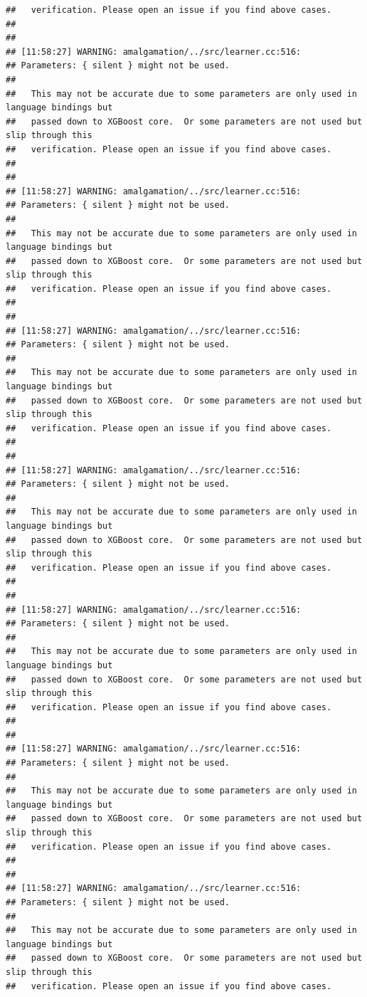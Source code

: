 \documentclass[AMS,STIX2COL]{WileyNJD-v2}\usepackage[]{graphicx}\usepackage[]{color}
\makeatletter
\newenvironment{kframe}{%
 \def\at@end@of@kframe{}%
 \ifinner\ifhmode%
  \def\at@end@of@kframe{\end{minipage}}%
  \begin{minipage}{\columnwidth}%
 \fi\fi%
 \def\FrameCommand##1{\hskip\@totalleftmargin \hskip-\fboxsep
 \colorbox{shadecolor}{##1}\hskip-\fboxsep
     \hskip-\linewidth \hskip-\@totalleftmargin \hskip\columnwidth}%
 \MakeFramed {\advance\hsize-\width
   \@totalleftmargin\z@ \linewidth\hsize
   \@setminipage}}%
 {\par\unskip\endMakeFramed%
 \at@end@of@kframe}
\newenvironment{knitrout}{}{} %
\makeatother
\begin{document}
\begin{knitrout}
\begin{kframe}
\begin{verbatim}
##   verification. Please open an issue if you find above cases.
## 
## 
## [11:58:27] WARNING: amalgamation/../src/learner.cc:516: 
## Parameters: { silent } might not be used.
## 
##   This may not be accurate due to some parameters are only used in language bindings but
##   passed down to XGBoost core.  Or some parameters are not used but slip through this
##   verification. Please open an issue if you find above cases.
## 
## 
## [11:58:27] WARNING: amalgamation/../src/learner.cc:516: 
## Parameters: { silent } might not be used.
## 
##   This may not be accurate due to some parameters are only used in language bindings but
##   passed down to XGBoost core.  Or some parameters are not used but slip through this
##   verification. Please open an issue if you find above cases.
## 
## 
## [11:58:27] WARNING: amalgamation/../src/learner.cc:516: 
## Parameters: { silent } might not be used.
## 
##   This may not be accurate due to some parameters are only used in language bindings but
##   passed down to XGBoost core.  Or some parameters are not used but slip through this
##   verification. Please open an issue if you find above cases.
## 
## 
## [11:58:27] WARNING: amalgamation/../src/learner.cc:516: 
## Parameters: { silent } might not be used.
## 
##   This may not be accurate due to some parameters are only used in language bindings but
##   passed down to XGBoost core.  Or some parameters are not used but slip through this
##   verification. Please open an issue if you find above cases.
## 
## 
## [11:58:27] WARNING: amalgamation/../src/learner.cc:516: 
## Parameters: { silent } might not be used.
## 
##   This may not be accurate due to some parameters are only used in language bindings but
##   passed down to XGBoost core.  Or some parameters are not used but slip through this
##   verification. Please open an issue if you find above cases.
## 
## 
## [11:58:27] WARNING: amalgamation/../src/learner.cc:516: 
## Parameters: { silent } might not be used.
## 
##   This may not be accurate due to some parameters are only used in language bindings but
##   passed down to XGBoost core.  Or some parameters are not used but slip through this
##   verification. Please open an issue if you find above cases.
## 
## 
## [11:58:27] WARNING: amalgamation/../src/learner.cc:516: 
## Parameters: { silent } might not be used.
## 
##   This may not be accurate due to some parameters are only used in language bindings but
##   passed down to XGBoost core.  Or some parameters are not used but slip through this
##   verification. Please open an issue if you find above cases.

\end{verbatim}
\end{kframe}
\end{knitrout}
\end{document}
